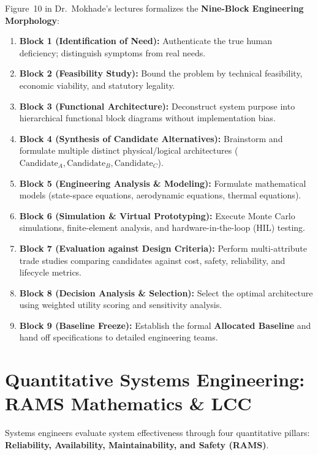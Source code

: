 Figure~10 in Dr.~Mokhade's lectures formalizes the \textbf{Nine-Block Engineering Morphology}:
\begin{enumerate}[leftmargin=2em]
    \item \textbf{Block 1 (Identification of Need):} Authenticate the true human deficiency; distinguish symptoms from real needs.
    \item \textbf{Block 2 (Feasibility Study):} Bound the problem by technical feasibility, economic viability, and statutory legality.
    \item \textbf{Block 3 (Functional Architecture):} Deconstruct system purpose into hierarchical functional block diagrams without implementation bias.
    \item \textbf{Block 4 (Synthesis of Candidate Alternatives):} Brainstorm and formulate multiple distinct physical/logical architectures ($\text{Candidate}_A, \text{Candidate}_B, \text{Candidate}_C$).
    \item \textbf{Block 5 (Engineering Analysis \& Modeling):} Formulate mathematical models (state-space equations, aerodynamic equations, thermal equations).
    \item \textbf{Block 6 (Simulation \& Virtual Prototyping):} Execute Monte Carlo simulations, finite-element analysis, and hardware-in-the-loop (HIL) testing.
    \item \textbf{Block 7 (Evaluation against Design Criteria):} Perform multi-attribute trade studies comparing candidates against cost, safety, reliability, and lifecycle metrics.
    \item \textbf{Block 8 (Decision Analysis \& Selection):} Select the optimal architecture using weighted utility scoring and sensitivity analysis.
    \item \textbf{Block 9 (Baseline Freeze):} Establish the formal \textbf{Allocated Baseline} and hand off specifications to detailed engineering teams.
\end{enumerate}

\section{Quantitative Systems Engineering: RAMS Mathematics \& LCC}
\label{sec:rams_mathematics}

Systems engineers evaluate system effectiveness through four quantitative pillars: \textbf{Reliability, Availability, Maintainability, and Safety (RAMS)}.

